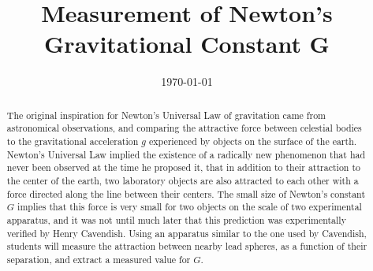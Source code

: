 \documentclass{revtex4}
\begin{document}

\title{Measurement of Newton's Gravitational Constant G}




\date{\today}

\begin{abstract}
The original inspiration for Newton's Universal Law of gravitation
came from astronomical observations, and comparing the attractive force
between celestial bodies to the gravitational acceleration $g$ experienced
by objects on the surface of the earth.  Newton's Universal Law implied
the existence of a radically new phenomenon that had never been observed
at the time he proposed it, that in addition to their attraction to the
center of the earth, two laboratory objects are also attracted to each
other with a force directed along the line between their centers.  The
small size of Newton's constant $G$ implies that this force is very small
for two objects on the scale of two experimental apparatus, and it was not
until much later that this prediction was experimentally verified by
Henry Cavendish.  Using an apparatus similar to the one used by Cavendish,
students will measure the attraction between nearby lead spheres, as a 
function of their separation, and extract a measured value for $G$.
\end{abstract}
\end{document}
